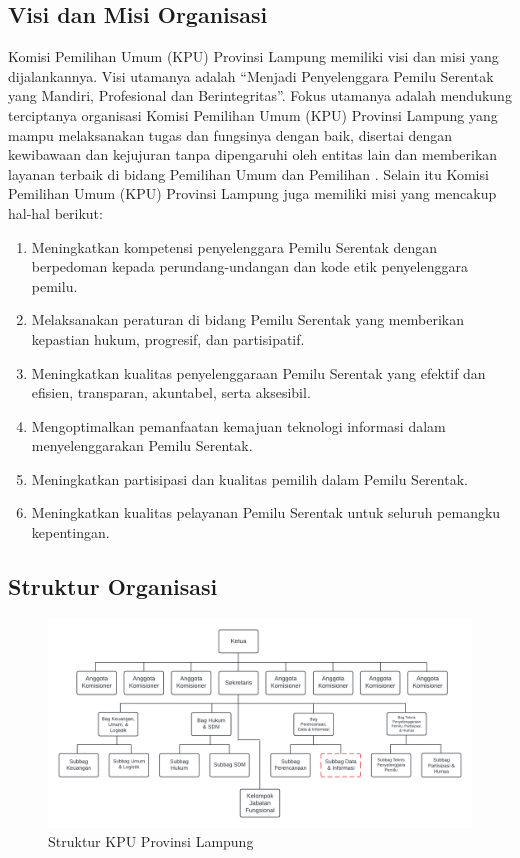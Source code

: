 \subsection{Visi dan Misi Organisasi}
Komisi Pemilihan Umum (KPU) Provinsi Lampung memiliki visi dan misi yang dijalankannya. Visi utamanya adalah “Menjadi Penyelenggara Pemilu Serentak yang Mandiri, Profesional dan Berintegritas”. Fokus utamanya adalah mendukung terciptanya organisasi Komisi Pemilihan Umum (KPU) Provinsi Lampung yang mampu melaksanakan tugas dan fungsinya dengan baik, disertai dengan kewibawaan dan kejujuran tanpa dipengaruhi oleh entitas lain dan memberikan layanan terbaik di bidang Pemilihan Umum dan Pemilihan \cite{VisiMisiKPU}. Selain itu Komisi Pemilihan Umum (KPU) Provinsi Lampung juga memiliki misi yang mencakup hal-hal berikut:
\begin{enumerate}
    \item Meningkatkan kompetensi penyelenggara Pemilu Serentak dengan berpedoman kepada perundang-undangan dan kode etik penyelenggara pemilu.
    \item Melaksanakan peraturan di bidang Pemilu Serentak yang memberikan kepastian hukum, progresif, dan partisipatif.
    \item Meningkatkan kualitas penyelenggaraan Pemilu Serentak yang efektif dan efisien, transparan, akuntabel, serta aksesibil.
    \item Mengoptimalkan pemanfaatan kemajuan teknologi informasi dalam menyelenggarakan Pemilu Serentak. 
    \item Meningkatkan partisipasi dan kualitas pemilih dalam Pemilu Serentak.
    \item Meningkatkan kualitas pelayanan Pemilu Serentak untuk seluruh pemangku kepentingan.
\end{enumerate}
 
\subsection{Struktur Organisasi}
\begin{figure}[h]
    \centering
    \includegraphics[width=1\linewidth]{images/kpu_struktur.png}
    \caption{Struktur KPU Provinsi Lampung}
    \label{fig:kpu_struktur}
\end{figure}

